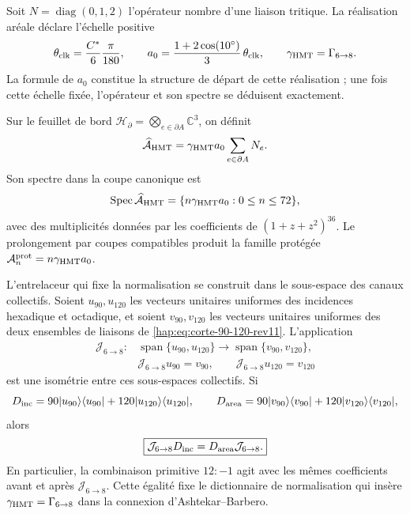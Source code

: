 Soit \(N=\operatorname{diag}(0,1,2)\) l’opérateur nombre d’une liaison tritique.
La réalisation aréale déclare l’échelle positive
\[
 \theta_{\rm clk}=\frac{C^*}{6}\frac{\pi}{180},
 \qquad
 a_0=\frac{1+2\cos(10^\circ)}{3}\,\theta_{\rm clk},
 \qquad \gamma_{\rm HMT}=\Gamma_{6\to8}.
\]
La formule de \(a_0\) constitue la structure de départ de cette
réalisation ; une fois cette échelle fixée, l’opérateur et son spectre se déduisent
exactement.

\begin{definition}
Sur le feuillet de bord
\(\mathcal H_{\partial}=\bigotimes_{e\in\partial A}\mathbb C^3\), on définit
\begin{equation}
 \widehat{\mathcal A}_{\rm HMT}
 =\gamma_{\rm HMT}a_0\sum_{e\in\partial A}N_e.
 \label{hap:eq:operador-area-hmt-rev11}
\end{equation}
Son spectre dans la coupe canonique est
\[
 \operatorname{Spec}\widehat{\mathcal A}_{\rm HMT}
 =\{n\gamma_{\rm HMT}a_0:0\leq n\leq72\},
\]
avec des multiplicités données par les coefficients de
\((1+z+z^2)^{36}\). Le prolongement par coupes compatibles produit la
famille protégée \(\mathcal A_n^{\rm prot}=n\gamma_{\rm HMT}a_0\).
\end{definition}

L’entrelaceur qui fixe la normalisation se construit dans le sous-espace des
canaux collectifs. Soient \(u_{90},u_{120}\) les vecteurs unitaires uniformes
des incidences hexadique et octadique, et soient \(v_{90},v_{120}\) les
vecteurs unitaires uniformes des deux ensembles de liaisons de
\eqref{hap:eq:corte-90-120-rev11}. L’application
\begin{equation}
 \begin{aligned}
 \mathcal J_{6\to8}:{}
 &\operatorname{span}\{u_{90},u_{120}\}
 \longrightarrow
 \operatorname{span}\{v_{90},v_{120}\},\\
 &\mathcal J_{6\to8}u_{90}=v_{90},
 \qquad
 \mathcal J_{6\to8}u_{120}=v_{120}
 \end{aligned}
 \label{hap:eq:entrelazador-area-barbero-rev11}
\end{equation}
est une isométrie entre ces sous-espaces collectifs. Si
\[
 D_{\rm inc}=90|u_{90}\rangle\langle u_{90}|
 +120|u_{120}\rangle\langle u_{120}|,
 \qquad
 D_{\rm area}=90|v_{90}\rangle\langle v_{90}|
 +120|v_{120}\rangle\langle v_{120}|,
\]
alors
\[
 \boxed{\mathcal J_{6\to8}D_{\rm inc}
 =D_{\rm area}\mathcal J_{6\to8}.}
\]
En particulier, la combinaison primitive \(12:-1\) agit
avec les mêmes coefficients avant et après \(\mathcal J_{6\to8}\). Cette
égalité fixe le dictionnaire de normalisation qui insère
\(\gamma_{\rm HMT}=\Gamma_{6\to8}\) dans la connexion
d’Ashtekar--Barbero.

